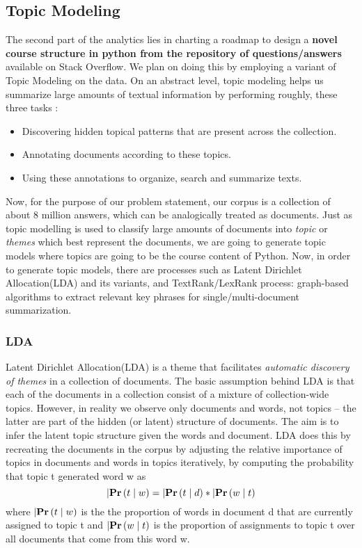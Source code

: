 \documentclass[journal]{IEEEtran}
\def\P(#1){\Phelper#1|\relax\Pchoice(#1)}
\def\Phelper#1|#2\relax{\ifx\relax#2\relax\def\Pchoice{\Pone}\else\def\Pchoice{\Ptwo}\fi}
\def\Pone(#1){\Pr\left( #1 \right)}
\def\Ptwo(#1|#2){\Pr\left( #1 \mid #2 \right)}
\def\Pr{\mathbf{Pr}}
\begin{document}
\subsection{Topic Modeling}
The second part of the analytics lies in charting a roadmap to design a \textbf{novel course structure in python from the repository of questions/answers} available on Stack Overflow. We plan on doing this by employing a variant of Topic Modeling on the data. On an abstract level, topic modeling helps us summarize large amounts of textual information by performing roughly, these three tasks :
\begin{itemize}
\item Discovering hidden topical patterns that are present across the collection.
\item Annotating documents according to these topics.
\item Using these annotations to organize, search and summarize texts.
\end{itemize}
Now, for the purpose of our problem statement, our corpus is a collection of about 8 million answers, which can be analogically treated as documents. Just as topic modelling is used to classify large amounts of documents into \textit{topic} or \textit{themes} which best represent the documents, we are going to generate topic models where topics are going to be the course content of Python. Now, in order to generate topic models, there are processes such as Latent Dirichlet Allocation(LDA) and its variants, and TextRank/LexRank process: graph-based algorithms to extract relevant key phrases for single/multi-document summarization.  
\vspace{0.5cm}

\subsubsection{LDA}
Latent Dirichlet Allocation(LDA) is a theme that facilitates \textit{automatic discovery of themes} in a collection of documents. The basic assumption behind LDA is that each of the documents in a collection consist of a mixture of collection-wide topics. However, in reality we observe only documents and words, not topics – the latter are part of the hidden (or latent) structure of documents. The aim is to infer the latent topic structure given the words and document. LDA does this by recreating the documents in the corpus by adjusting the relative importance of topics in documents and words in topics iteratively, by computing the probability that topic t generated word w as
\begin{equation}
    \P(t | w) = \P(t | d) * \P(w | t)
\end{equation}
where $\P(t | w)$ is the the proportion of words in document d that are currently assigned to topic t and $\P(w | t)$ is the proportion of assignments to topic t over all documents that come from this word w. 
\end{document}
